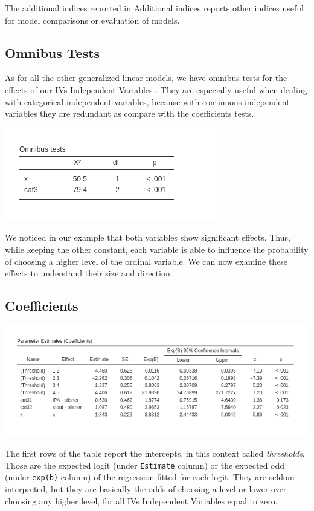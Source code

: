 \documentclass[
]{book}
\begin{document}
The additional indices reported in {Additional indices} reports other indices useful for model comparisons or evaluation of models.

\hypertarget{omnibus-tests-3}{%
\subsection{Omnibus Tests}\label{omnibus-tests-3}}

As for all the other generalized linear models, we have omnibus tests for the effects of our {IVs {Independent Variables} }. They are especially useful when dealing with categorical independent variables, because with continuous independent variables they are redundant as compare with the coefficients tests.

\includegraphics{bookletpics/3_ordinal_output3.png}

We noticed in our example that both variables show significant effects. Thus, while keeping the other constant, each variable is able to influence the probability of choosing a higher level of the ordinal variable. We can now examine these effects to understand their size and direction.

\hypertarget{coefficients-3}{%
\subsection{Coefficients}\label{coefficients-3}}

\includegraphics{bookletpics/3_ordinal_output4.png}

The first rows of the table report the intercepts, in this context called \emph{thresholds}. Those are the expected logit (under \texttt{Estimate} column) or the expected odd (under \texttt{exp(b)} column) of the regression fitted for each logit. They are seldom interpreted, but they are basically the odds of choosing a level or lower over choosing any higher level, for all {IVs {Independent Variables} } equal to zero.
\end{document}
